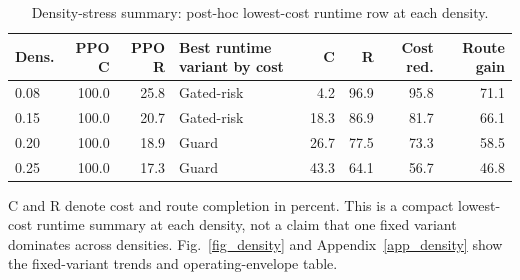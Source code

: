 
\begin{table}[t]
\centering
\caption{Density-stress summary: post-hoc lowest-cost runtime row at each density.}
\label{tab_density_summary}
\scriptsize
\setlength{\tabcolsep}{3.4pt}
\renewcommand{\arraystretch}{1.08}
\begin{tabular}{@{}lrrlrrrr@{}}
\toprule
Dens. & PPO C & PPO R & Best runtime variant by cost & C & R & Cost red. & Route gain \\
\midrule
0.08 & 100.0 & 25.8 & Gated-risk & 4.2 & 96.9 & 95.8 & 71.1 \\
0.15 & 100.0 & 20.7 & Gated-risk & 18.3 & 86.9 & 81.7 & 66.1 \\
0.20 & 100.0 & 18.9 & Guard & 26.7 & 77.5 & 73.3 & 58.5 \\
0.25 & 100.0 & 17.3 & Guard & 43.3 & 64.1 & 56.7 & 46.8 \\
\bottomrule
\end{tabular}
\begin{tablenotes}
\item C and R denote cost and route completion in percent. This is a compact lowest-cost runtime summary at each density, not a claim that one fixed variant dominates across densities. Fig.~\ref{fig_density} and Appendix~\ref{app_density} show the fixed-variant trends and operating-envelope table.
\end{tablenotes}
\end{table}
